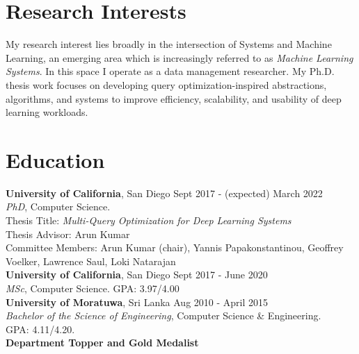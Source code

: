 \documentclass[margin]{res}
\begin{document}

\address{Phone: (+1) 812-558-6888\\ Email: snakanda@eng.ucsd.edu\\ Web: \href{https://scnakandala.github.io}{https://scnakandala.github.io}}
\address{3232 EBU3B CSE\\9500 Gilman Drive\\La Jolla, CA 92093}


\begin{resume}
\vspace{-2mm}
\section{Research Interests}
My research interest lies broadly in the intersection of Systems and Machine Learning, an emerging area which is increasingly referred to as \textit{Machine Learning Systems}. In this space I operate as a data management researcher. My Ph.D. thesis work focuses on developing query optimization-inspired abstractions, algorithms, and systems to improve efficiency, scalability, and usability of deep learning workloads.


\section{Education}
\textbf{University of California}, San Diego \hfill Sept 2017 - (expected) March 2022\\ 
{\sl PhD}, Computer Science.\\
Thesis Title: \textit{Multi-Query Optimization for Deep Learning Systems}\\
\quad Thesis Advisor: Arun Kumar\\
\quad Committee Members: Arun Kumar (chair), Yannis Papakonstantinou, Geoffrey Voelker, Lawrence Saul, Loki Natarajan\\

\vspace{-5mm}
\textbf{University of California}, San Diego \hfill Sept 2017 - June 2020\\
{\sl MSc}, Computer Science. GPA: 3.97/4.00\\

\vspace{-5mm}
\textbf{University of Moratuwa}, Sri Lanka \hfill Aug 2010 - April 2015\\
{\sl Bachelor of the Science of Engineering}, Computer Science \& Engineering.\\
GPA: 4.11/4.20.\\
\textbf{Department Topper and Gold Medalist}\\




\end{resume}
\end{document}
